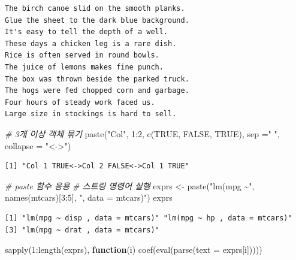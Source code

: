 \documentclass[
  11pt,
]{krantz}
\newenvironment{Shaded}{\begin{snugshade}}{\end{snugshade}}
\newcommand{\AttributeTok}[1]{\textcolor[rgb]{0.61,0.61,0.61}{#1}}
\newcommand{\CommentTok}[1]{\textcolor[rgb]{0.37,0.37,0.37}{\textit{#1}}}
\newcommand{\ConstantTok}[1]{\textcolor[rgb]{0,0,0}{#1}}
\newcommand{\ControlFlowTok}[1]{\textcolor[rgb]{0.27,0.27,0.27}{\textbf{#1}}}
\newcommand{\DecValTok}[1]{\textcolor[rgb]{0.06,0.06,0.06}{#1}}
\newcommand{\FunctionTok}[1]{\textcolor[rgb]{0,0,0}{#1}}
\newcommand{\NormalTok}[1]{#1}
\newcommand{\OtherTok}[1]{\textcolor[rgb]{0.37,0.37,0.37}{#1}}
\newcommand{\SpecialCharTok}[1]{\textcolor[rgb]{0,0,0}{#1}}
\newcommand{\StringTok}[1]{\textcolor[rgb]{0.5,0.5,0.5}{#1}}
\begin{document}
\begin{verbatim}
The birch canoe slid on the smooth planks.
Glue the sheet to the dark blue background.
It's easy to tell the depth of a well.
These days a chicken leg is a rare dish.
Rice is often served in round bowls.
The juice of lemons makes fine punch.
The box was thrown beside the parked truck.
The hogs were fed chopped corn and garbage.
Four hours of steady work faced us.
Large size in stockings is hard to sell.
\end{verbatim}

\begin{Shaded}
\begin{Highlighting}[]
\CommentTok{\# 3개 이상 객체 묶기}
\FunctionTok{paste}\NormalTok{(}\StringTok{"Col"}\NormalTok{, }\DecValTok{1}\SpecialCharTok{:}\DecValTok{2}\NormalTok{, }\FunctionTok{c}\NormalTok{(}\ConstantTok{TRUE}\NormalTok{, }\ConstantTok{FALSE}\NormalTok{, }\ConstantTok{TRUE}\NormalTok{), }\AttributeTok{sep =}\StringTok{" "}\NormalTok{, }\AttributeTok{collapse =} \StringTok{"\textless{}{-}\textgreater{}"}\NormalTok{)}
\end{Highlighting}
\end{Shaded}

\begin{verbatim}
[1] "Col 1 TRUE<->Col 2 FALSE<->Col 1 TRUE"
\end{verbatim}

\begin{Shaded}
\begin{Highlighting}[]
\CommentTok{\# paste 함수 응용}
\CommentTok{\# 스트링 명령어 실행 }
\NormalTok{exprs }\OtherTok{\textless{}{-}} \FunctionTok{paste}\NormalTok{(}\StringTok{"lm(mpg \textasciitilde{}"}\NormalTok{, }\FunctionTok{names}\NormalTok{(mtcars)[}\DecValTok{3}\SpecialCharTok{:}\DecValTok{5}\NormalTok{], }\StringTok{", data = mtcars)"}\NormalTok{)}
\NormalTok{exprs}
\end{Highlighting}
\end{Shaded}

\begin{verbatim}
[1] "lm(mpg ~ disp , data = mtcars)" "lm(mpg ~ hp , data = mtcars)"  
[3] "lm(mpg ~ drat , data = mtcars)"
\end{verbatim}

\begin{Shaded}
\begin{Highlighting}[]
\FunctionTok{sapply}\NormalTok{(}\DecValTok{1}\SpecialCharTok{:}\FunctionTok{length}\NormalTok{(exprs), }\ControlFlowTok{function}\NormalTok{(i) }\FunctionTok{coef}\NormalTok{(}\FunctionTok{eval}\NormalTok{(}\FunctionTok{parse}\NormalTok{(}\AttributeTok{text =}\NormalTok{ exprs[i]))))}
\end{Highlighting}
\end{Shaded}
\end{document}
